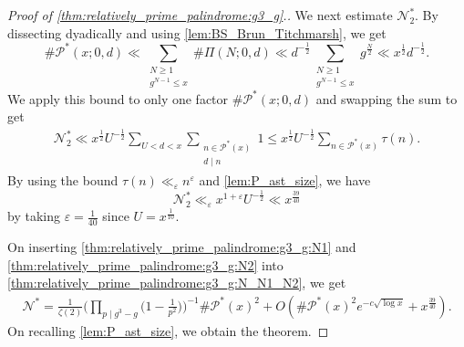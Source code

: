 \documentclass{amsart}
\theoremstyle{plain}
\theoremstyle{definition}
\newif\ifendnotes
\let\tmp\phi
\let\phi\varphi
\let\varphi\tmp
\let\tmp\epsilon
\let\epsilon\varepsilon
\let\varepsilon\tmp
\begin{document}
\begin{proof}[Proof of \cref{thm:relatively_prime_palindrome:g3_g}.]
We next estimate $\mathscr{N}_{2}^{\ast}$.
By dissecting dyadically and using \cref{lem:BS_Brun_Titchmarsh},
we get
\[
\#\mathscr{P}^{\ast}(x;0,d)
\ll
\sum_{\substack{
N\ge 1\\
g^{N-1}\le x
}}
\#\Pi(N;0,d)
\ll
d^{-\frac{1}{2}}
\sum_{\substack{
N\ge 1\\
g^{N-1}\le x
}}
g^{\frac{N}{2}}
\ll
x^{\frac{1}{2}}d^{-\frac{1}{2}}.
\]
We apply this bound to only one factor $\#\mathscr{P}^{\ast}(x;0,d)$
and swapping the sum to get
\begin{align}
\mathscr{N}_{2}^{\ast}
\ll
x^{\frac{1}{2}}U^{-\frac{1}{2}}
\sum_{U<d<x}
\sum_{\substack{
n\in\mathscr{P}^{\ast}(x)\\
d\mid n
}}
1
\le
x^{\frac{1}{2}}U^{-\frac{1}{2}}
\sum_{n\in\mathscr{P}^{\ast}(x)}
\tau(n).
\end{align}
By using the bound $\tau(n)\ll_{\epsilon}n^{\epsilon}$
and \cref{lem:P_ast_size}, we have
\begin{equation}
\label{thm:relatively_prime_palindrome:g3_g:N2}
\mathscr{N}_{2}^{\ast}
\ll_{\epsilon}
x^{1+\epsilon}U^{-\frac{1}{2}}
\ll
x^{\frac{39}{40}}
\end{equation}
by taking $\epsilon=\frac{1}{40}$ since $U=x^{\frac{1}{10}}$.

On inserting \cref{thm:relatively_prime_palindrome:g3_g:N1} and \cref{thm:relatively_prime_palindrome:g3_g:N2}
into \cref{thm:relatively_prime_palindrome:g3_g:N_N1_N2}, we get
\begin{align}
\mathscr{N}^{\ast}
=
\frac{1}{\zeta(2)}
\biggl(\prod_{p\mid g^{3}-g}\biggl(1-\frac{1}{p^{2}}\biggr)\biggr)^{-1}
\#\mathscr{P}^{\ast}(x)^{2}
+
O(
\#\mathscr{P}^{\ast}(x)^{2}e^{-c\sqrt{\log x}}
+
x^{\frac{39}{40}}
).
\end{align}
On recalling \cref{lem:P_ast_size}, we obtain the theorem.
\end{proof}



\ifendnotes
\newpage
\begingroup
\parindent 0pt
\parskip 2ex
\def\enotesize{\normalsize}
\theendnotes
\endgroup
\fi



\bigskip
\end{document}
